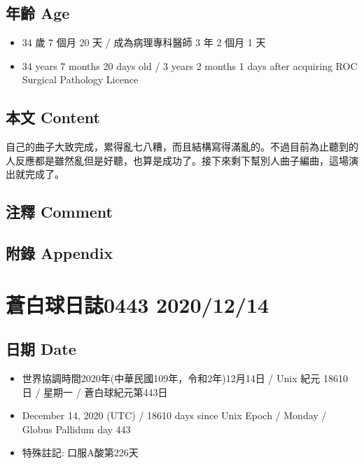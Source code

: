 \documentclass[
]{article}
\providecommand{\tightlist}{%
  \setlength{\itemsep}{0pt}\setlength{\parskip}{0pt}}
\begin{document}
\hypertarget{ux5e74ux9f61-age-12}{%
\subsection{年齡 Age}\label{ux5e74ux9f61-age-12}}

\begin{itemize}
\tightlist
\item
  34 歲 7 個月 20 天 / 成為病理專科醫師 3 年 2 個月 1 天
\item
  34 years 7 months 20 days old / 3 years 2 months 1 days after
  acquiring ROC Surgical Pathology Licence
\end{itemize}

\hypertarget{ux672cux6587-content-12}{%
\subsection{本文 Content}\label{ux672cux6587-content-12}}

自己的曲子大致完成，累得亂七八糟，而且結構寫得滿亂的。不過目前為止聽到的人反應都是雖然亂但是好聽，也算是成功了。接下來剩下幫別人曲子編曲，這場演出就完成了。

\hypertarget{ux6ce8ux91cb-comment-12}{%
\subsection{注釋 Comment}\label{ux6ce8ux91cb-comment-12}}

\hypertarget{ux9644ux9304-appendix-12}{%
\subsection{附錄 Appendix}\label{ux9644ux9304-appendix-12}}

\hypertarget{ux84bcux767dux7403ux65e5ux8a8c0443-20201214}{%
\section{蒼白球日誌0443
2020/12/14}\label{ux84bcux767dux7403ux65e5ux8a8c0443-20201214}}

\hypertarget{ux65e5ux671f-date-13}{%
\subsection{日期 Date}\label{ux65e5ux671f-date-13}}

\begin{itemize}
\tightlist
\item
  世界協調時間2020年(中華民國109年，令和2年)12月14日 / Unix 紀元 18610
  日 / 星期一 / 蒼白球紀元第443日
\item
  December 14, 2020 (UTC) / 18610 days since Unix Epoch / Monday /
  Globus Pallidum day 443
\item
  特殊註記: 口服A酸第226天
\end{itemize}
\end{document}
